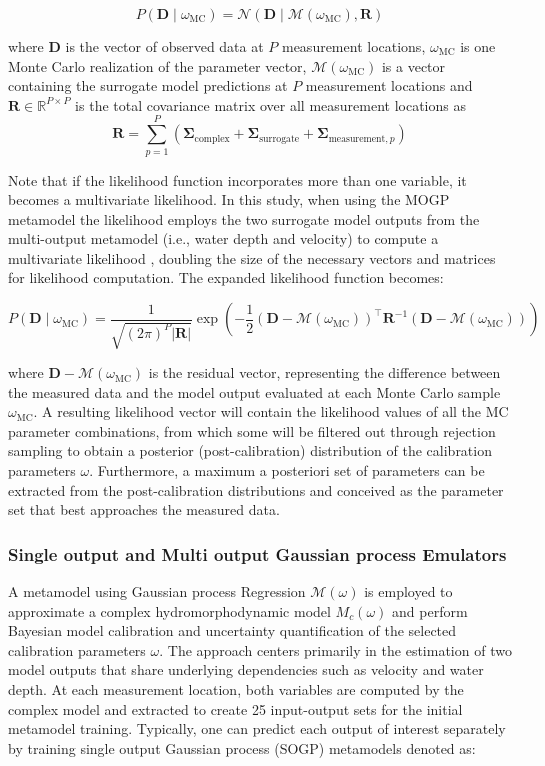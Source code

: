 \documentclass[draft,linenumbers,onecolumn]{agujournal2019} %
\begin{document}
\[
P(\bm{D} \mid \omega_{\text{MC}}) = \mathcal{N}(\bm{D} \mid \mathcal{M}(\omega_{\text{MC}}), \bm{R})
\]

where $\bm{D}$ is the vector of observed data at $P$ measurement locations, $\omega_{\text{MC}}$ is one Monte Carlo realization of the parameter vector, $\mathcal{M}(\omega_{\text{MC}})$ is a vector containing the surrogate model predictions at $P$ measurement locations and $\bm{R} \in \mathbb{R}^{P \times P}$ is the total covariance matrix over all measurement locations as 
\[
\mathbf{R} = \sum_{p=1}^{P} \left( \mathbf{\Sigma}_{\text{complex}} + \mathbf{\Sigma}_{\text{surrogate}} + \mathbf{\Sigma}_{\text{measurement},p} \right)
\]

Note that if the likelihood function incorporates more than one variable, it becomes a multivariate likelihood. In this study, when using the MOGP metamodel the likelihood employs the two surrogate model outputs from the multi-output metamodel (i.e., water depth and velocity) to compute a multivariate likelihood , doubling the size of the necessary vectors and matrices for likelihood computation. The expanded likelihood function becomes: 

\[
P(\bm{D} \mid \omega_{\text{MC}}) = \frac{1}{\sqrt{(2\pi)^P |\bm{R}|}} \exp\left( -\frac{1}{2} \left( \bm{D} - \mathcal{M}(\omega_{\text{MC}}) \right)^\top \bm{R}^{-1} \left( \bm{D} - \mathcal{M}(\omega_{\text{MC}}) \right) \right)
\]

where $\bm{D} - \mathcal{M}(\omega_{\text{MC}})$ is the residual vector, representing the difference between the measured data and the model output evaluated at each Monte Carlo sample $\omega_{\text{MC}}$. A resulting likelihood vector will contain the likelihood values of all the MC parameter combinations, from which some will be filtered out through rejection sampling \cite{smith1992bayesian} to obtain a posterior (post-calibration) distribution of the calibration parameters $\omega$. Furthermore, a maximum a posteriori set of parameters can be extracted from the post-calibration distributions and conceived as the parameter set that best approaches the measured data.


\subsubsection{Single output and Multi output Gaussian process Emulators}
\label{subsec:sec2.6.2}

A metamodel using Gaussian process Regression $\mathcal{M}(\omega)$ is employed to approximate a complex hydromorphodynamic model $M_c (\omega)$ and perform Bayesian model calibration and uncertainty quantification of the selected calibration parameters $\omega$. The approach centers primarily in the estimation of two model outputs that share underlying dependencies such as velocity and water depth. At each  measurement location, both variables are computed by the complex model and extracted to create 25 input-output sets for the initial metamodel training. Typically, one can predict each output of interest separately by training single output Gaussian process (SOGP) metamodels denoted as:
\end{document}
